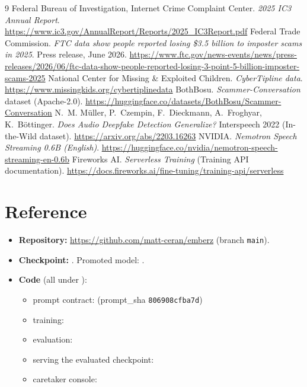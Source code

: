 \documentclass[11pt]{article}
\begin{document}
\begin{thebibliography}{9}\small
{} Federal Bureau of Investigation, Internet Crime Complaint Center. \emph{2025 IC3 Annual Report}. \url{https://www.ic3.gov/AnnualReport/Reports/2025_IC3Report.pdf}
 Federal Trade Commission. \emph{FTC data show people reported losing \$3.5 billion to imposter scams in 2025}. Press release, June 2026. \url{https://www.ftc.gov/news-events/news/press-releases/2026/06/ftc-data-show-people-reported-losing-3-point-5-billion-imposter-scams-2025}
 National Center for Missing \& Exploited Children. \emph{CyberTipline data}. \url{https://www.missingkids.org/cybertiplinedata}
 BothBosu. \emph{Scammer-Conversation} dataset (Apache-2.0). \url{https://huggingface.co/datasets/BothBosu/Scammer-Conversation}
 N.~M. M\"uller, P.~Czempin, F.~Dieckmann, A.~Froghyar, K.~B\"ottinger. \emph{Does Audio Deepfake Detection Generalize?} Interspeech 2022 (In-the-Wild dataset). \url{https://arxiv.org/abs/2203.16263}
 NVIDIA. \emph{Nemotron Speech Streaming 0.6B (English)}. \url{https://huggingface.co/nvidia/nemotron-speech-streaming-en-0.6b}
 Fireworks AI. \emph{Serverless Training} (Training API documentation). \url{https://docs.fireworks.ai/fine-tuning/training-api/serverless}
\end{thebibliography}

\appendix
\section{Reference}
\sloppy
\begin{itemize}
\item \textbf{Repository:} \url{https://github.com/matt-ceran/emberz} (branch \texttt{main}).
\item \textbf{Checkpoint:} . Promoted model: .
\item \textbf{Code} (all under ):
  \begin{itemize}
  \item prompt contract:  (prompt\_sha \texttt{806908cfba7d})
  \item training: 
  \item evaluation: 
  \item serving the evaluated checkpoint: 
  \item caretaker console: 
  \end{itemize}
\end{itemize}
\end{document}
